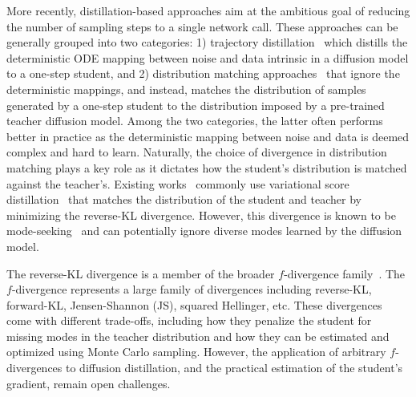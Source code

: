 More recently, distillation-based approaches aim at the ambitious goal of reducing the number of sampling steps to a single network call. These approaches can be generally grouped into two categories: 1) trajectory distillation~\cite{song2023consistency, song2023improved, geng2024consistency, lee2024truncated, lu2024simplifying} which distills the deterministic ODE mapping between noise and data intrinsic in a diffusion model to a one-step student, and 2) distribution matching approaches~\cite{yin2024one, yin2024improved, zheng2024diffusion, zhou2024score} that ignore the deterministic mappings, and instead, matches the distribution of samples generated by a one-step student to the distribution imposed by a pre-trained teacher diffusion model. Among the two categories, the latter often performs better in practice as the deterministic mapping between noise and data is deemed complex and hard to learn. Naturally, the choice of divergence in distribution matching plays a key role as it dictates how the student's distribution is matched against the teacher's. Existing works~\cite{yin2024one, yin2024improved, dao2025swiftbrush, nguyen2024swiftbrush} commonly use variational score distillation~\cite{Wang2023ProlificDreamerHA} that matches the distribution of the student and teacher by minimizing the reverse-KL divergence. However, this divergence is known to be mode-seeking~\cite{Bishop2006PatternRA} and can potentially ignore diverse modes learned by the diffusion model. 




The reverse-KL divergence is a member of the broader $f$-divergence family~\cite{Rnyi1961OnMO}. The $f$-divergence represents a large family of divergences including reverse-KL, forward-KL, Jensen-Shannon (JS), squared Hellinger, etc. These divergences come with different trade-offs, including how they penalize the student for missing modes in the teacher distribution and how they can be estimated and optimized using Monte Carlo sampling. However, the application of arbitrary $f$-divergences to diffusion distillation, and the practical estimation of the student's gradient, remain open challenges.  

